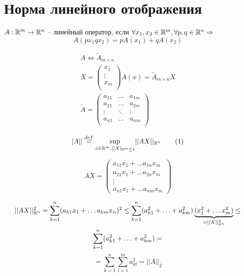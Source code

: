 \documentclass[main]{subfiles}
\begin{document}
\chapter{Норма линейного отображения}
\begin{definition}
    $A: {\mathbb{R}}^m \rightarrow {\mathbb{R}}^n$ -- линейный оператор, если
    $ \forall x_1, x_2 \in {\mathbb{R}}^m, \forall p, q \in {\mathbb{R}}^n \Rightarrow$
    \[A(px_1 qx_2) = pA(x_1) + qA(x_2)\]
\end{definition}
\begin{gather*}
    A \Leftrightarrow \tilde{A}_{m \times n} \\
    X =
        \begin{pmatrix}
            x_1 \\
            \vdots \\
            x_m  \\
        \end{pmatrix}
    A(x) = \tilde{A}_{m \times n} X \\
    \tilde{A} = 
    \begin{pmatrix}
        a_{11} & \ldots & a_{1m} \\
        a_{21} & \ldots & a_{2m} \\
        \vdots & \ddots & \vdots \\
        a_{n1} & \ldots & a_{nm} \\
    \end{pmatrix}
\end{gather*}

\begin{definition}
    \[|A|| \stackrel{def}{=} \underset{x \in {\mathbb{R}}^m, ||X|_{{\mathbb{R}}^m \leq 1}}{\sup}
     {||AX||_{{\mathbb{R}}^n}} \tag{1} \]
\end{definition}


\[AX = \begin{pmatrix}
    a_{11}x_1 + \ldots a_{1n}x_m \\
    a_{21}x_1 + \ldots a_{2n}x_m \\
    \vdots \\
    a_{n1}x_1 + \ldots a_{nm}x_m
\end{pmatrix}\]



\begin{multline*}
    ||AX||^2_{{\mathbb{R}}^n} = \sum_{k=1}^n(a_{k1}x_1 + \ldots a_{km}x_n)^2 \leq 
    \sum_{k=1}^n (a^2_{k1} + \ldots + a^2_{km})\underbrace{(x_1^2 + \ldots x_m^2)}_{=||X||^2_{{\mathbb{R}}^n}} \leq \\
    \sum_{k=1}^n (a^2_{k1} + \ldots + a^2_{km}) =
\end{multline*}
     \[=\sum_{k=1}^n \sum_{l=1}^m a_{kl}^2 =||A||_2  \tag{2}\]
\end{document}
